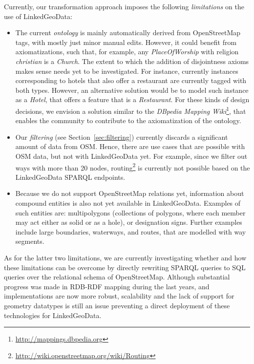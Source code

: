 Currently, our transformation approach imposes the following\emph{ limitations} on the use of
LinkedGeoData:
\begin{itemize}
  \item The current \emph{ontology} is mainly automatically derived from
  OpenStreetMap tags, with mostly just minor manual edits. However, it could
  benefit from axiomatizations, such that, for example, any \emph{PlaceOfWorship} with religion
  \emph{christian} is a \emph{Church}.
  The extent to which the addition of disjointness axioms makes sense needs yet
  to be investigated. For instance, currently instances corresponding to
  hotels that also offer a restaurant are currently tagged with both types.
  However, an alternative solution would be to model such instance as a
  \emph{Hotel}, that offers a feature that is a \emph{Restaurant}. For these
  kinds of design decisions, we envision a solution similar to the \emph{DBpedia
  Mapping Wiki}\footnote{\url{http://mappings.dbpedia.org}}, that enables the
  community to contribute to the axiomatization of the ontology.
  
  \item Our \emph{filtering} (see Section~\ref{sec:filtering}) currently
  discards a significant amount of data from OSM. Hence, there are use
  cases that are possible with OSM data, but not with LinkedGeoData yet.
  For example, since we filter out ways with more than 20 nodes, 
  routing\footnote{\url{http://wiki.openstreetmap.org/wiki/Routing}} is currently not
  possible based on the LinkedGeoData SPARQL endpoints.
    
  \item Because we do not support OpenStreetMap relations yet, information about
  compound entities is also not yet available in LinkedGeoData. 
  Examples of such entities are: multipolygons (collections
  of polygons, where each member may act either as solid or as a hole), or
  designation signs. Further examples include large boundaries, waterways, and
  routes, that are modelled with way segments.
\end{itemize}

As for the latter two limitations, we are currently investigating whether and
how these limitations can be overcome by directly rewriting SPARQL queries to SQL queries over
the relational schema of OpenStreetMap.
Although substantial progress was made in RDB-RDF mapping
during the last years, and implementations are now more robust, scalability
and the lack of support for geometry datatypes is still an issue
preventing a direct deployment of these technologies for LinkedGeoData.


